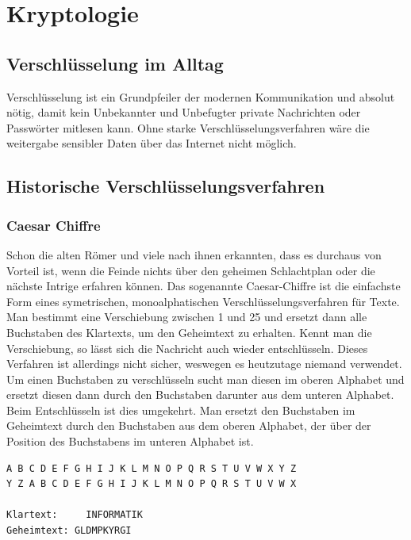 \section{Kryptologie}
\subsection{Verschlüsselung im Alltag}

Verschlüsselung ist ein Grundpfeiler der modernen Kommunikation und absolut nötig,
damit kein Unbekannter und Unbefugter private Nachrichten oder Passwörter mitlesen
kann. Ohne starke Verschlüsselungsverfahren wäre die weitergabe sensibler Daten über
das Internet nicht möglich.

\subsection{Historische Verschlüsselungsverfahren}

\subsubsection{Caesar Chiffre}

Schon die alten Römer und viele nach ihnen erkannten, dass es durchaus von Vorteil
ist, wenn die Feinde nichts über den geheimen Schlachtplan oder die nächste Intrige
erfahren können.
Das sogenannte Caesar-Chiffre ist die einfachste Form eines symetrischen,
monoalphatischen Verschlüsselungsverfahren für Texte.
Man bestimmt eine Verschiebung zwischen 1 und 25 und ersetzt dann
alle Buchstaben des Klartexts, um den Geheimtext zu erhalten.
Kennt man die Verschiebung, so lässt sich die Nachricht auch wieder entschlüsseln.
Dieses Verfahren ist allerdings nicht sicher, weswegen es heutzutage niemand verwendet.
Um einen Buchstaben zu verschlüsseln sucht man diesen im oberen Alphabet und
ersetzt diesen dann durch den Buchstaben darunter aus dem unteren Alphabet.
Beim Entschlüsseln ist dies umgekehrt. Man ersetzt den Buchstaben im Geheimtext
durch den Buchstaben aus dem oberen Alphabet, der über der Position des Buchstabens
im unteren Alphabet ist.

\begin{lstlisting}
A B C D E F G H I J K L M N O P Q R S T U V W X Y Z
Y Z A B C D E F G H I J K L M N O P Q R S T U V W X

Klartext:     INFORMATIK
Geheimtext: GLDMPKYRGI
\end{lstlisting}

\clearpage

